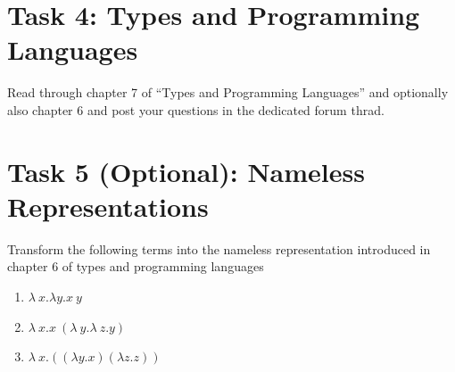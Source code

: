 \section*{Task 4: Types and Programming Languages}
Read through chapter 7 of ``Types and Programming Languages'' and optionally also chapter 6 and post your questions in the dedicated forum thrad.

\section*{Task 5 (Optional): Nameless Representations}
Transform the following terms into the nameless representation introduced in chapter 6 of types and programming languages 
\begin{enumerate}
  \item $\lambda\ x. \lambda y. x\ y$
  \item $\lambda\ x. x\ (\lambda\ y. \lambda\ z. y)$
  \item $\lambda\ x. ((\lambda y. x) (\lambda z. z))$
\end{enumerate}
